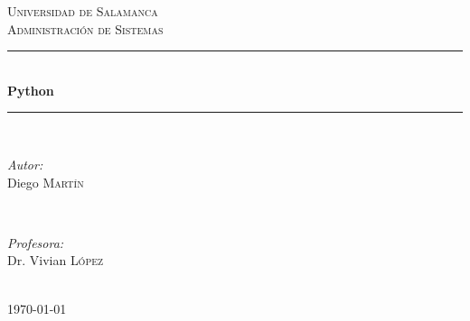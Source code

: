 \documentclass[12pt]{article} %
\begin{document}

\begin{titlepage}

\newcommand{\HRule}{\rule{\linewidth}{0.5mm}} %

\center %

\textsc{\LARGE Universidad de Salamanca}\\[1.5cm] %
\textsc{\Large Administración de Sistemas}\\[0.5cm] %

\HRule \\[0.4cm]
{ \huge \bfseries Python}\\[0.4cm] %
\HRule \\[1.5cm]

\begin{minipage}{0.4\textwidth}
\begin{flushleft} \large
\emph{Autor:}\\
Diego \textsc{Martín} %
\end{flushleft}
\end{minipage}
~
\begin{minipage}{0.4\textwidth}
\begin{flushright} \large
\emph{Profesora:} \\
Dr. Vivian \textsc{López} %
\end{flushright}
\end{minipage}\\[4cm]

{\large \today}\\[3cm] %


\vfill %

\end{titlepage}

\end{document}
